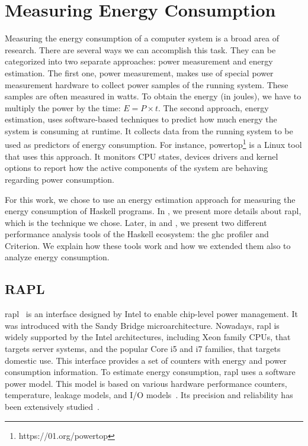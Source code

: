 \chapter{Measuring Energy Consumption}\label{chapter:tools}
Measuring the energy consumption of a computer system is a broad area of research. There are several ways we can accomplish this task. They can be categorized into two separate approaches: power measurement and energy estimation. The first one, power measurement, makes use of special power measurement hardware to collect power samples of the running system. These samples are often measured in watts. To obtain the energy (in joules), we have to multiply the power by the time: $E = P \times t$.
The second approach, energy estimation, uses software-based techniques to predict how much energy the system is consuming at runtime. It collects data from the running system to be used as predictors of energy consumption. For instance, powertop\footnote{https://01.org/powertop} is a Linux tool that uses this approach. It monitors CPU states, devices drivers and kernel options to report how the active components of the system are behaving regarding power consumption.

For this work, we chose to use an energy estimation approach for measuring the energy consumption of Haskell programs. In , we present more details about \acs{rapl}, which is the technique we chose. Later, in  and , we present two different performance analysis tools of the Haskell ecosystem: the \acs{ghc} profiler and Criterion. We explain how these tools work and how we extended them also to analyze energy consumption.

\section{RAPL}\label{sec:rapl}
\ac{rapl}~\cite{david:2010} is an interface designed by Intel to enable chip-level power management. It was introduced with the Sandy Bridge microarchitecture. Nowadays, \acs{rapl} is widely supported by the Intel architectures, including Xeon family CPUs, that targets server systems, and the popular Core i5 and i7 families, that targets domestic use. This interface provides a set of counters with energy and power consumption information. To estimate energy consumption, \acs{rapl} uses a software power model. This model is based on various hardware performance counters, temperature, leakage models, and I/O models~\cite{weaver:2012}. Its precision and reliability has been extensively studied~\cite{rotem:2012,hahnel:2012}.


